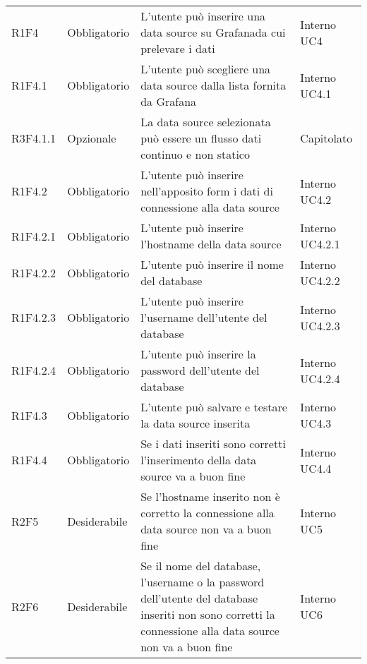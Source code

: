 \begin{longtable} {
		>{}p{24mm} 
		>{}p{32mm}
		>{}p{40mm} 
		>{}p{24.5mm}
		}
		R1F4 & Obbligatorio & L'utente può inserire una data source su Grafana\glosp da cui prelevare i dati & Interno UC4 \TBstrut \\ [2mm]
		R1F4.1 & Obbligatorio & L'utente può scegliere una data source dalla lista fornita da Grafana\glo & Interno UC4.1 \TBstrut \\ [2mm]
		R3F4.1.1 & Opzionale & La data source selezionata può essere un flusso dati continuo e non statico & Capitolato \TBstrut \\ [2mm]
        R1F4.2 & Obbligatorio & L'utente può inserire nell'apposito form i dati di connessione alla data source & Interno UC4.2 \TBstrut \\ [2mm]
		R1F4.2.1 & Obbligatorio & L'utente può inserire l'hostname della data source & Interno UC4.2.1 \TBstrut \\ [2mm]
		R1F4.2.2 & Obbligatorio & L'utente può inserire il nome del database & Interno UC4.2.2 \TBstrut \\ [2mm]
        R1F4.2.3 & Obbligatorio & L'utente può inserire l'username dell'utente del database & Interno UC4.2.3 \TBstrut \\ [2mm]
        R1F4.2.4 & Obbligatorio & L'utente può inserire la password dell'utente del database & Interno UC4.2.4 \TBstrut \\ [2mm]
		R1F4.3 & Obbligatorio & L'utente può salvare e testare la data source inserita & Interno UC4.3 \TBstrut \\ [2mm]
		R1F4.4 & Obbligatorio & Se i dati inseriti sono corretti l'inserimento della data source va a buon fine & Interno UC4.4 \TBstrut \\ [2mm]
        R2F5 & Desiderabile & Se l'hostname inserito non è corretto la connessione alla data source non va a buon fine & Interno UC5 \TBstrut \\ [2mm]
		R2F6 & Desiderabile & Se il nome del database, l'username o la password dell'utente del database inseriti non sono corretti la connessione alla data source non va a buon fine & Interno UC6 \TBstrut \\ [2mm]
	\end{longtable}